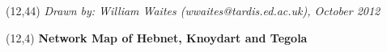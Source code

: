 \documentclass[noborder,onecolumn]{netmap}
\begin{document}
\begin{textblock}{32}(12,44)
  \textit{Drawn by: William Waites (wwaites@tardis.ed.ac.uk), October 2012}
\end{textblock}
\begin{textblock}{32}(12,4)
  \textbf{\Huge Network Map of Hebnet, Knoydart and Tegola}
\end{textblock}
\end{document}
